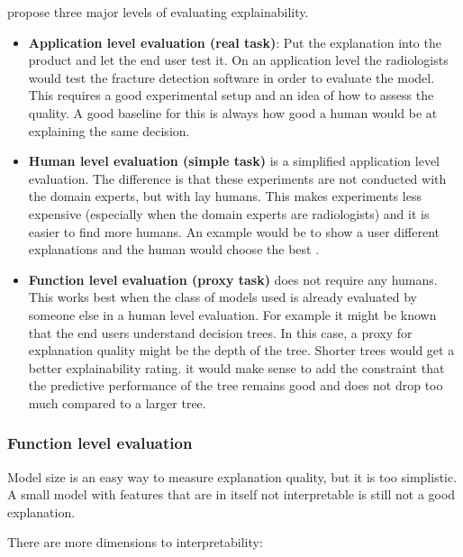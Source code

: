 \documentclass[12pt,]{krantz}
\providecommand{\tightlist}{%
  \setlength{\itemsep}{0pt}\setlength{\parskip}{0pt}}
\theoremstyle{definition}
\theoremstyle{definition}
\theoremstyle{definition}
\theoremstyle{remark}
\begin{document}
\citep{Doshi-Velez2017} propose three major levels of evaluating
explainability.

\begin{itemize}
\tightlist
\item
  \textbf{Application level evaluation (real task)}: Put the explanation
  into the product and let the end user test it. On an application level
  the radiologists would test the fracture detection software in order
  to evaluate the model. This requires a good experimental setup and an
  idea of how to assess the quality. A good baseline for this is always
  how good a human would be at explaining the same decision.
\item
  \textbf{Human level evaluation (simple task)} is a simplified
  application level evaluation. The difference is that these experiments
  are not conducted with the domain experts, but with lay humans. This
  makes experiments less expensive (especially when the domain experts
  are radiologists) and it is easier to find more humans. An example
  would be to show a user different explanations and the human would
  choose the best .
\item
  \textbf{Function level evaluation (proxy task)} does not require any
  humans. This works best when the class of models used is already
  evaluated by someone else in a human level evaluation. For example it
  might be known that the end users understand decision trees. In this
  case, a proxy for explanation quality might be the depth of the tree.
  Shorter trees would get a better explainability rating. it would make
  sense to add the constraint that the predictive performance of the
  tree remains good and does not drop too much compared to a larger
  tree.
\end{itemize}

\subsubsection{Function level
evaluation}\label{function-level-evaluation}

Model size is an easy way to measure explanation quality, but it is too
simplistic. A small model with features that are in itself not
interpretable is still not a good explanation.

There are more dimensions to interpretability:
\end{document}
